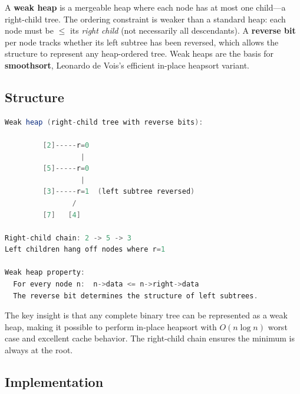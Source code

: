A \textbf{weak heap} is a mergeable heap where each node has at most one child---a right-child tree. The ordering constraint is weaker than a standard heap: each node must be $\le $ its \emph{right child} (not necessarily all descendants). A \textbf{reverse bit} per node tracks whether its left subtree has been reversed, which allows the structure to represent any heap-ordered tree. Weak heaps are the basis for \textbf{smoothsort}, Leonardo de Vois's efficient in-place heapsort variant.

\subsection{Structure}

\begin{lstlisting}[language=Java]
Weak heap (right-child tree with reverse bits):

         [2]-----r=0
                  |
         [5]-----r=0
                  |
         [3]-----r=1  (left subtree reversed)
                /
         [7]   [4]

Right-child chain: 2 -> 5 -> 3
Left children hang off nodes where r=1

Weak heap property:
  For every node n:  n->data <= n->right->data
  The reverse bit determines the structure of left subtrees.
\end{lstlisting}

The key insight is that any complete binary tree can be represented as a weak heap, making it possible to perform in-place heapsort with $O(n \log n)$ worst case and excellent cache behavior. The right-child chain ensures the minimum is always at the root.

\subsection{Implementation}

